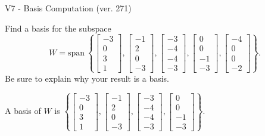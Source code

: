 \begin{exercise}
  \begin{exerciseTitle}V7 - Basis Computation (ver. 271)\end{exerciseTitle}
  \begin{exerciseStatement}
    Find a basis for the subspace 
\[W=\mathrm{span}\ \left\{\left[\begin{array}{r}
-3 \\
0 \\
3 \\
1
\end{array}\right] , \left[\begin{array}{r}
-1 \\
2 \\
0 \\
-3
\end{array}\right] , \left[\begin{array}{r}
-3 \\
-4 \\
-4 \\
-3
\end{array}\right] , \left[\begin{array}{r}
0 \\
0 \\
-1 \\
-3
\end{array}\right] , \left[\begin{array}{r}
-4 \\
0 \\
0 \\
-2
\end{array}\right]\right\}.\]
 Be sure to explain why your result is a basis.


  \end{exerciseStatement}
  \begin{exerciseAnswer}
   A basis of \(W\) is  \(\left\{\left[\begin{array}{r}
-3 \\
0 \\
3 \\
1
\end{array}\right] , \left[\begin{array}{r}
-1 \\
2 \\
0 \\
-3
\end{array}\right] , \left[\begin{array}{r}
-3 \\
-4 \\
-4 \\
-3
\end{array}\right] , \left[\begin{array}{r}
0 \\
0 \\
-1 \\
-3
\end{array}\right]\right\}\).
  


  \end{exerciseAnswer}
\end{exercise}